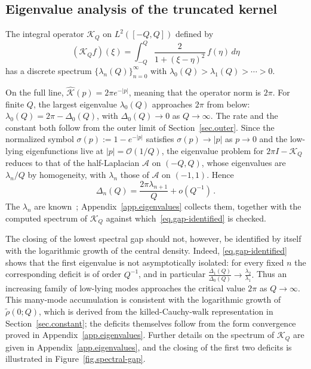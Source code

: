 \documentclass[11pt,a4paper]{article}
\newcommand{\lam}{\lambda}
\theoremstyle{definition}
\begin{document}
\subsection{Eigenvalue analysis of the truncated kernel}
\label{sec.eigenvalue-summary}
The integral operator $\mathcal{K}_Q$ on $L^2([-Q,Q])$ defined by
\begin{equation}\label{eq.KQ-def}
  (\mathcal{K}_Q f)(\xi) = \int_{-Q}^{Q}\frac{2}{1+(\xi-\eta)^2}\,f(\eta)\,d\eta
\end{equation}
has a discrete spectrum $\{\lam_n(Q)\}_{n=0}^{\infty}$ with $\lam_0(Q)>\lam_1(Q)>\cdots>0$.

On the full line, $\hat{\mathcal{K}}(p)=2\pi e^{-|p|}$, meaning that the operator norm is $2\pi$. For finite $Q$, the largest eigenvalue $\lam_0(Q)$ approaches $2\pi$ from below:
$\lam_0(Q) = 2\pi - \Delta_0(Q)$, with $\Delta_0(Q)\to 0$ as $Q\to\infty$.
The rate and the constant both follow from the outer limit of
Section~\ref{sec.outer}.  Since the normalized  symbol $\sigma(p):=1-e^{-|p|}$ satisfies $\sigma(p) \to |p|$ as $p \to 0$ and the
low-lying eigenfunctions live at $|p| = \mathcal O(1/Q)$, the eigenvalue problem
for $2\pi I - \mathcal{K}_Q$ reduces to that of the half-Laplacian
$\mathcal{A}$ on $(-Q,Q)$, whose eigenvalues are $\lambda_n/Q$ by homogeneity,
with $\lambda_n$ those of $\mathcal{A}$ on $(-1,1)$.  Hence
\begin{equation}\label{eq.gap-identified}
  \Delta_n(Q) = \frac{2\pi\lambda_{n+1}}{Q} + o\left(Q^{-1}\right)\,.
\end{equation}
The $\lambda_n$ are known~\cite{Kwasnicki2012}; Appendix~\ref{app.eigenvalues}
collects them, together with the computed spectrum of $\mathcal K_Q$ against
which~\eqref{eq.gap-identified} is checked.

The closing of the lowest spectral gap should not, however, be identified by
itself with the logarithmic growth of the central density.  Indeed,
\eqref{eq.gap-identified} shows that the first eigenvalue is not asymptotically
isolated: for every fixed $n$ the corresponding deficit is of order $Q^{-1}$,
and in particular $\frac{\Delta_1(Q)}{\Delta_0(Q)} \longrightarrow \frac{\lambda_2}{\lambda_1}.$
Thus an increasing family of low-lying modes approaches the critical value
$2\pi$ as $Q\to\infty$.  This many-mode accumulation is consistent with the
logarithmic growth of $\tilde\rho(0;Q)$, which is derived from the
killed-Cauchy-walk representation in Section~\ref{sec.constant}; the deficits
themselves follow from the form convergence proved in
Appendix~\ref{app.eigenvalues}.  Further details on the spectrum
of $\mathcal K_Q$ are given in Appendix~\ref{app.eigenvalues}, and the closing
of the first two deficits is illustrated in Figure~\ref{fig.spectral-gap}.
\end{document}
